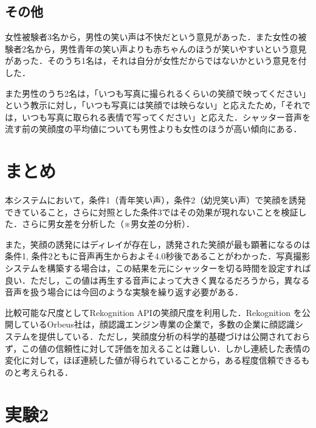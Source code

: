 \documentclass[submit,techreq]{ec2014}
\begin{document}
\subsection{その他}

女性被験者3名から，男性の笑い声は不快だという意見があった．また女性の被験者2名から，男性青年の笑い声よりも赤ちゃんのほうが笑いやすいという意見があった．そのうち1名は，それは自分が女性だからではないかという意見を付した．

また男性のうち2名は，「いつも写真に撮られるくらいの笑顔で映ってください」という教示に対し，「いつも写真には笑顔では映らない」と応えたため，「それでは，いつも写真に取られる表情で写ってください」と応えた．シャッター音声を流す前の笑顔度の平均値についても男性よりも女性のほうが高い傾向にある．

\section{まとめ}

本システムにおいて，条件1（青年笑い声），条件2（幼児笑い声）で笑顔を誘発できていること，さらに対照とした条件3ではその効果が現れないことを検証した．さらに男女差を分析した（※男女差の分析）．

また，笑顔の誘発にはディレイが存在し，誘発された笑顔が最も顕著になるのは条件1, 条件2ともに音声再生からおよそ4.0秒後であることがわかった．写真撮影システムを構築する場合は，この結果を元にシャッターを切る時間を設定すれば良い．ただし，この値は再生する音声によって大きく異なるだろうから，異なる音声を扱う場合には今回のような実験を繰り返す必要がある．

比較可能な尺度としてRekognition APIの笑顔尺度を利用した．Rekognition を公開しているOrbeus社は，顔認識エンジン専業の企業で，多数の企業に顔認識システムを提供している．ただし，笑顔度分析の科学的基礎づけは公開されておらず，この値の信頼性に対して評価を加えることは難しい．しかし連続した表情の変化に対して，ほぼ連続した値が得られていることから，ある程度信頼できるものと考えられる．

\section{実験2}



\begin{thebibliography}{10}

\end{thebibliography}



\end{document}
